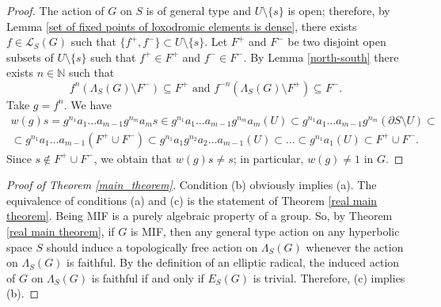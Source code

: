 \documentclass[11pt,letterpaper]{article}
\newcommand{\NN}{\mathbb{N}}
\theoremstyle{definition}
\theoremstyle{remark}
\begin{document}
\begin{proof}
The action of $G$ on $S$ is of general type and $U \setminus \{s\}$ is open; therefore, by Lemma \ref{set of fixed points of loxodromic elements is dense}, there exists $f \in \mathcal{L}_S(G)$ such that $\{f^+, f^-\} \subset  U \setminus \{s\}$. Let $F^+$ and $F^-$ be two disjoint open subsets of $ U \setminus \{s\}$ such that $f^+ \in F^+$ and $f^- \in F^-$. By Lemma \ref{north-south} there exists $n \in \NN$ such that
$$
f^n(\Lambda_S(G) \setminus F^-) \subseteq F^+ \text{ and } f^{-n}(\Lambda_S(G) \setminus F^+) \subseteq F^-.
$$
Take $g=f^n$. We have
 \begin{multline*}
    w(g)s = g^{n_1}a_1 \ldots a_{m-1}g^{n_m}a_ms \in g^{n_1}a_1 \ldots a_{m-1}g^{n_m}a_m(U) \subset g^{n_1}a_1 \ldots a_{m-1}g^{n_m}(\partial S \setminus U) \subset \\
    \subset g^{n_1}a_1 \ldots a_{m-1}(F^+ \cup F^-) \subset g^{n_1}a_1g^{n_2}a_2 \ldots a_{m-1}(U) \subset \ldots \subset g^{n_1}a_1(U) \subset F^+ \cup F^-.  
    \end{multline*}
    Since $s \not\in F^+ \cup F^-$, we obtain that $w(g)s \neq s$; in particular, $w(g) \neq 1$ in $G$.
    \end{proof}


\begin{proof}[Proof of Theorem \ref{main_theorem}]
Condition (b) obviously implies (a). The equivalence of conditions (a) and (c) is the statement of Theorem \ref{real main theorem}. Being MIF is a purely algebraic property of a group. So, by Theorem \ref{real main theorem}, if $G$ is MIF, then any general type action on any hyperbolic space $S$ should induce a topologically free action on $\Lambda_S(G)$ whenever the action on $\Lambda_S(G)$ is faithful. By the definition of an elliptic radical, the induced action of $G$ on $\Lambda_S(G)$ is faithful if and only if $E_S(G)$ is trivial. Therefore, (c) implies (b).
\end{proof}
\end{document}
